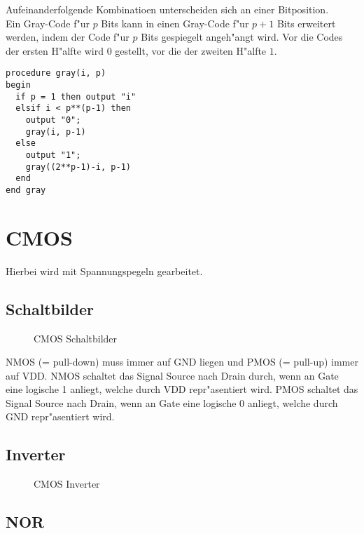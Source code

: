 \documentclass[german, 10pt, a4paper, twocolumn]{scrartcl}
\theoremstyle{definition}
\begin{document}
Aufeinanderfolgende Kombinatioen unterscheiden sich an einer Bitposition.\\

Ein Gray-Code f"ur $p$ Bits kann in einen Gray-Code f"ur $p+1$ Bits erweitert werden, indem der Code f"ur $p$ Bits gespiegelt angeh"angt wird. Vor die Codes der ersten H"alfte wird $0$ gestellt, vor die der zweiten H"alfte $1$.

\begin{verbatim}
procedure gray(i, p)
begin
  if p = 1 then output "i"
  elsif i < p**(p-1) then
    output "0";
    gray(i, p-1)
  else
    output "1";
    gray((2**p-1)-i, p-1)
  end
end gray
\end{verbatim}

\section{CMOS}

Hierbei wird mit Spannungspegeln gearbeitet.

\subsection{Schaltbilder}

\begin{figure}[hbt]
 
 \centerline{\box\graph}
 \caption{CMOS Schaltbilder}
 \label{schaltbilder}
\end{figure}

NMOS (= pull-down) muss immer auf GND liegen und PMOS (= pull-up) immer auf VDD. NMOS schaltet das Signal Source nach Drain durch, wenn an Gate eine logische 1 anliegt, welche durch VDD repr"asentiert wird. PMOS schaltet das Signal Source nach Drain, wenn an Gate eine logische 0 anliegt, welche durch GND repr"asentiert wird.

\pagebreak
\subsection{Inverter}

\begin{figure}[hbt]
 
 \centerline{\box\graph}
 \caption{CMOS Inverter}
 \label{cmos_inverter}
\end{figure}


\subsection{NOR}
\end{document}

